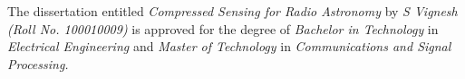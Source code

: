 \vspace{0.2in}

 The dissertation entitled \textit{Compressed Sensing for Radio Astronomy} by \textit{S Vignesh (Roll No. 100010009)} is approved for the degree of \textit{Bachelor in Technology} in \textit{Electrical Engineering} and \textit{Master of Technology} in \textit{Communications and Signal Processing.}


